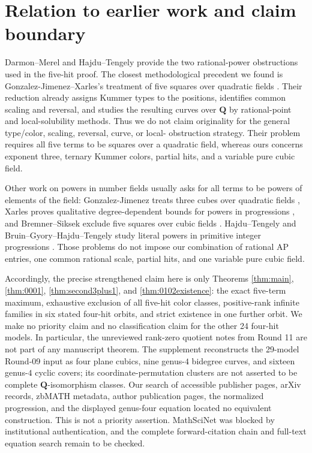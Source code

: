 \documentclass[10pt]{article}
\newcommand{\Q}{\mathbf Q}
\begin{document}
\section{Relation to earlier work and claim boundary}

Darmon--Merel and Hajdu--Tengely provide the two rational-power obstructions
used in the five-hit proof.  The closest methodological precedent we found is
Gonzalez-Jimenez--Xarles's treatment of five squares over quadratic fields
\cite{GJX}.  Their reduction already assigns Kummer types to the positions,
identifies common scaling and reversal, and studies the resulting curves over
$\Q$ by rational-point and local-solubility methods.  Thus we do not claim
originality for the general type/color, scaling, reversal, curve, or local-
obstruction strategy.  Their problem requires all five terms to be squares
over a quadratic field, whereas ours concerns exponent three, ternary
Kummer colors, partial hits, and a variable pure cubic field.

Other work on powers in number fields usually asks for all terms to be powers
of elements of the field: Gonzalez-Jimenez treats three cubes over quadratic
fields \cite{GJ}, Xarles proves qualitative degree-dependent bounds for
powers in progressions \cite{Xarles}, and Bremner--Siksek exclude five
squares over cubic fields \cite{BS}.  Hajdu--Tengely and
Bruin--Gyory--Hajdu--Tengely study literal powers in primitive integer
progressions \cite{HTold,BGHT}.  Those problems do not impose our combination
of rational AP entries, one common rational scale, partial hits, and one
variable pure cubic field.

Accordingly, the precise strengthened claim here is only Theorems
\ref{thm:main}, \ref{thm:0001}, \ref{thm:second3plus1}, and
\ref{thm:0102existence}: the exact five-term maximum, exhaustive exclusion
of all five-hit color classes, positive-rank infinite families in six stated
four-hit orbits, and strict existence in one further orbit.  We make no
priority claim and no classification claim for the other 24 four-hit models.
In particular, the unreviewed rank-zero quotient notes from Round 11 are not
part of any manuscript theorem.  The supplement reconstructs the 29-model
Round-09 input as four plane cubics, nine genus-$4$ bidegree curves, and
sixteen genus-$4$ cyclic covers; its coordinate-permutation clusters are not
asserted to be complete $\Q$-isomorphism classes.  Our search of accessible
publisher pages, arXiv records, zbMATH metadata, author publication pages,
the normalized progression, and the displayed genus-four equation located no
equivalent construction.  This is not a priority assertion.  MathSciNet was
blocked by institutional authentication, and the complete forward-citation
chain and full-text equation search remain to be checked.
\end{document}

